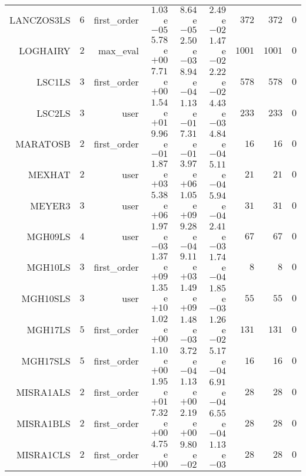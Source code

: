 \begin{longtable}{rrrrrrrrr}
LANCZOS3LS & \(     6\) & first\_order & \( 1.03\)e\(-05\) & \( 8.64\)e\(-05\) & \( 2.49\)e\(-02\) & \(   372\) & \(   372\) & \(     0\) \\
LOGHAIRY & \(     2\) & max\_eval & \( 5.78\)e\(+00\) & \( 2.50\)e\(-03\) & \( 1.47\)e\(-02\) & \(  1001\) & \(  1001\) & \(     0\) \\
LSC1LS & \(     3\) & first\_order & \( 7.71\)e\(+00\) & \( 8.94\)e\(-04\) & \( 2.22\)e\(-02\) & \(   578\) & \(   578\) & \(     0\) \\
LSC2LS & \(     3\) & user & \( 1.54\)e\(+01\) & \( 1.13\)e\(-01\) & \( 4.43\)e\(-03\) & \(   233\) & \(   233\) & \(     0\) \\
MARATOSB & \(     2\) & first\_order & \( 9.96\)e\(-01\) & \( 7.31\)e\(-01\) & \( 4.84\)e\(-04\) & \(    16\) & \(    16\) & \(     0\) \\
MEXHAT & \(     2\) & user & \( 1.87\)e\(+03\) & \( 3.97\)e\(+06\) & \( 5.11\)e\(-04\) & \(    21\) & \(    21\) & \(     0\) \\
MEYER3 & \(     3\) & user & \( 5.38\)e\(+06\) & \( 1.05\)e\(+09\) & \( 5.94\)e\(-04\) & \(    31\) & \(    31\) & \(     0\) \\
MGH09LS & \(     4\) & user & \( 1.97\)e\(-03\) & \( 9.28\)e\(-04\) & \( 2.41\)e\(-03\) & \(    67\) & \(    67\) & \(     0\) \\
MGH10LS & \(     3\) & first\_order & \( 1.37\)e\(+09\) & \( 9.11\)e\(+03\) & \( 1.74\)e\(-04\) & \(     8\) & \(     8\) & \(     0\) \\
MGH10SLS & \(     3\) & user & \( 1.35\)e\(+10\) & \( 1.49\)e\(+09\) & \( 1.85\)e\(-03\) & \(    55\) & \(    55\) & \(     0\) \\
MGH17LS & \(     5\) & first\_order & \( 1.02\)e\(+00\) & \( 1.48\)e\(-03\) & \( 1.26\)e\(-02\) & \(   131\) & \(   131\) & \(     0\) \\
MGH17SLS & \(     5\) & first\_order & \( 1.10\)e\(+00\) & \( 3.72\)e\(-04\) & \( 5.17\)e\(-04\) & \(    16\) & \(    16\) & \(     0\) \\
MISRA1ALS & \(     2\) & first\_order & \( 1.95\)e\(+01\) & \( 1.13\)e\(+00\) & \( 6.91\)e\(-04\) & \(    28\) & \(    28\) & \(     0\) \\
MISRA1BLS & \(     2\) & first\_order & \( 7.32\)e\(+00\) & \( 2.19\)e\(+00\) & \( 6.55\)e\(-04\) & \(    28\) & \(    28\) & \(     0\) \\
MISRA1CLS & \(     2\) & first\_order & \( 4.75\)e\(+00\) & \( 9.80\)e\(-02\) & \( 1.13\)e\(-03\) & \(    28\) & \(    28\) & \(     0\) \\

\end{longtable}
